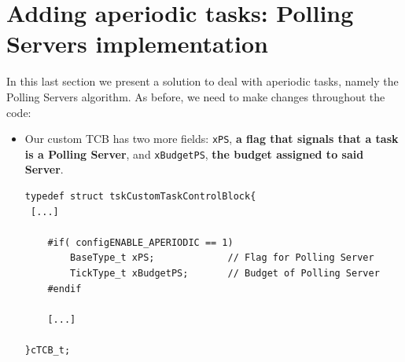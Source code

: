 \documentclass[10pt]{article}
\begin{document}
\section{Adding aperiodic tasks: Polling Servers implementation}
In this last section we present a solution to deal with aperiodic tasks, namely the Polling Servers algorithm.
As before, we need to make changes throughout the code:
\begin{itemize}
\item Our custom TCB has two more fields: \verb|xPS|, \textbf{a flag that signals that a task is a Polling Server}, and \verb|xBudgetPS|, \textbf{the budget assigned to said Server}. 
\begin{lstlisting}
typedef struct tskCustomTaskControlBlock{
 [...]

    #if( configENABLE_APERIODIC == 1)
        BaseType_t xPS;             // Flag for Polling Server
        TickType_t xBudgetPS;       // Budget of Polling Server
    #endif

    [...]

}cTCB_t;


\end{lstlisting}
\end{itemize}
\end{document}
